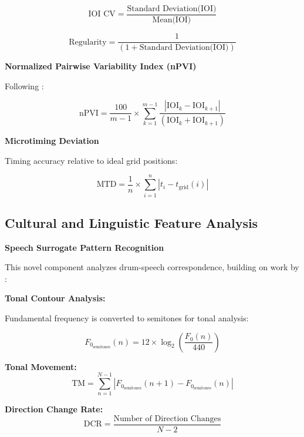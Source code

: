 \documentclass[12pt,a4paper]{article}
\begin{document}
\begin{equation}
\text{IOI CV} = \frac{\text{Standard Deviation(IOI)}}{\text{Mean(IOI)}}
\end{equation}

\begin{equation}
\text{Regularity} = \frac{1}{(1 + \text{Standard Deviation(IOI)})}
\end{equation}

\textbf{Normalized Pairwise Variability Index (nPVI)}

Following \citet{grabe2002durational}:

\begin{equation}
\text{nPVI} = \frac{100}{m-1} \times \sum_{k=1}^{m-1} \frac{|\text{IOI}_k - \text{IOI}_{k+1}|}{(\text{IOI}_k + \text{IOI}_{k+1})}
\end{equation}

\textbf{Microtiming Deviation}

Timing accuracy relative to ideal grid positions:

\begin{equation}
\text{MTD} = \frac{1}{n} \times \sum_{i=1}^n |t_i - t_{\text{grid}}(i)|
\end{equation}

\subsection{Cultural and Linguistic Feature Analysis}

\textbf{Speech Surrogate Pattern Recognition}

This novel component analyzes drum-speech correspondence, building on work by \citet{carrington1949talking, gleick2011information}:

\textbf{Tonal Contour Analysis:}

Fundamental frequency is converted to semitones for tonal analysis:

\begin{equation}
F_{0_{\text{semitones}}}(n) = 12 \times \log_2\left(\frac{F_0(n)}{440}\right)
\end{equation}

\textbf{Tonal Movement:}
\begin{equation}
\text{TM} = \sum_{n=1}^{N-1} |F_{0_{\text{semitones}}}(n+1) - F_{0_{\text{semitones}}}(n)|
\end{equation}

\textbf{Direction Change Rate:}
\begin{equation}
\text{DCR} = \frac{\text{Number of Direction Changes}}{N-2}
\end{equation}
\end{document}
